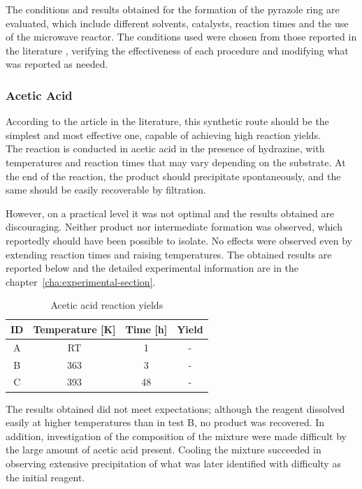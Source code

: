 \documentclass[../Master.tex]{subfiles}
\begin{document}
The conditions and results obtained for the formation of the pyrazole ring are evaluated, which include different solvents, catalysts, reaction times and the use of the microwave reactor. The conditions used were chosen from those reported in the literature \cite{leavai_synthesis_2002}, verifying the effectiveness of each procedure and modifying what was reported as needed.

\subsubsection{Acetic Acid}\label{sec:ace-cond}

According to the article in the literature, this synthetic route should be the simplest and most effective one, capable of achieving high reaction yields.\\ The reaction is conducted in acetic acid in the presence of hydrazine, with temperatures and reaction times that may vary depending on the substrate. At the end of the reaction, the product should precipitate spontaneously, and the same should be easily recoverable by filtration.

However, on a practical level it was not optimal and the results obtained are discouraging. Neither product nor intermediate formation was observed, which reportedly should have been possible to isolate. No effects were observed even by extending reaction times and raising temperatures. The obtained results are reported below and the detailed experimental information are in the chapter\ \ref{cha:experimental-section}.

\begin{table}[h!]
	\centering
	\begin{tabular}[b]{cccc}
		\toprule
		ID & Temperature [K] & Time [h] & Yield \\
		\midrule
		A  & RT              & 1        & -     \\
		B  & 363             & 3        & -     \\
		C  & 393             & 48       & -     \\
		\bottomrule
	\end{tabular}
	\caption{Acetic acid reaction yields}\label{tab:hydrazine-ratio}
\end{table}

The results obtained did not meet expectations; although the reagent dissolved easily at higher temperatures than in test B, no product was recovered.
In addition, investigation of the composition of the mixture were made difficult by the large amount of acetic acid present. Cooling the mixture succeeded in observing extensive precipitation of what was later identified with difficulty as the initial reagent.
\end{document}
